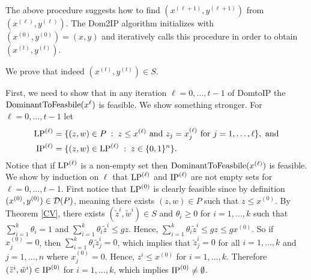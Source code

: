 The above procedure suggests how to find $(x^{(\ell+1)},y^{(\ell+1)})$ from $(x^{(\ell)},y^{(\ell)})$. The Dom2IP algorithm initializes with $(x^{(0)},y^{(0)})=(x,y)$ and  iteratively calls this procedure in order to obtain $(x^{(t)},y^{(t)})$. 
\iffalse{
\begin{algorithm}[H]
	\KwIn{$(x,y)\in \dom(S)$}
	\KwOut{$(x^{(t)},y^{(t)}) \in S$, $x^{(t)}\leq x$}
	$x^{(0)}\leftarrow x$\\
	\For{$\ell = 0$ \textbf{to} $t-1$}{
		$x^{(\ell+1)} \leftarrow x^{(\ell)}$\\
		$\eta \leftarrow$ optimal value of $ \DOMtoS(x^{(\ell)})$\\
		$y^{(\ell+1)}\leftarrow$ optimal solution for $w$ variables in $ \DOMtoS(x^{(\ell)})$\\
		\eIf{$\eta = 0$}{
			$x^{(\ell+1)}_{\ell+1} \leftarrow 0$\
		}{
			$x^{(\ell+1)}_{\ell+1} \leftarrow 1$
		}
	}
	\label{domtoIPalg}
	\caption{The Dom2IP algorithm}
\end{algorithm}
}\fi
We prove that indeed $(x^{(t)},y^{(t)})\in S$. 

	First, we need to show that in any iteration $\ell=  0,\ldots,t-1$ of DomtoIP the $\operatorname{DominantToFeasbile}(x^{\ell})$ is feasible. We show something stronger. For $\ell=0,\ldots,t-1$ let
	\begin{align*}
	\operatorname{LP}^{(\ell)}&= \{(z,w)\in P\; : \; z\leq x^{(\ell)} \mbox{ and } z_j=x_j^{(\ell)} \mbox{ for } j=1,\ldots,\ell\}, \text{ and}\\
	\operatorname{IP}^{(\ell)}&= \{(z,w)\in \operatorname{LP}^{(\ell)}\; : \; z\in \{0,1\}^n\}.
	\end{align*}
	Notice that if $\operatorname{LP}^{(\ell)}$ is a non-empty set then $\DOMtoS(x^{(\ell)})$ is feasible. We show by induction on $\ell$ that $\operatorname{LP}^{(\ell)}$ and $\operatorname{IP}^{(\ell)}$ are not empty sets for $\ell=0,\ldots,t-1$. First notice that $\operatorname{LP}^{(0)}$ is clearly feasible since by definition $(x^{(0)},y^{(0)})\in \operatorname{\mathcal{D}}(P)$, meaning there exists $(z,w)\in P$ such that $z\leq x^{(0)}$. By Theorem \ref{CV}, there exists $(\tilde{z}^i,\tilde{w}^i) \in S$ and $\theta_i\geq 0$ for $i=1,\ldots,k$ such that $\sum_{i=1}^{k} \theta_i = 1$ and $\sum_{i=1}^{k}\theta_i \tilde{z}^i \leq gz$. Hence, $\sum_{i=1}^{k}\theta_i \tilde{z}^i \leq gz\leq gx^{(0)}$. So if $x^{(0)}_j=0$, then $ \sum_{i=1}^{k}\theta_i \tilde{z}_j^i =0$, which implies that $\tilde{z}^i_j=0$ for all $i=1,\ldots,k$ and $j= 1,\ldots,n$ where $x^{(0)}_j=0$. Hence, $z^i\leq x^{(0)}$ for $i=1,\ldots,k$. Therefore $(\tilde{z}^i,\tilde{w}^i)\in \operatorname{IP}^{(0)}$ for $i=1,\ldots,k$, which implies $\operatorname{IP}^{(0)}\neq \emptyset$.
	
